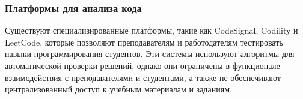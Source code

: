 \subsubsection{Платформы для анализа кода}
Существуют специализированные платформы, такие как CodeSignal\cite{codesignal_wiki}, Codility\cite{codility_wiki} и LeetCode\cite{leetcode_wiki}, которые позволяют преподавателям и работодателям тестировать навыки программирования студентов. Эти системы используют алгоритмы для автоматической проверки решений, однако они ограничены в функционале взаимодействия с преподавателями и студентами, а также не обеспечивают централизованный доступ к учебным материалам и заданиям.
